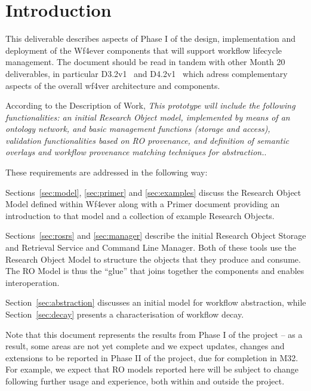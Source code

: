\section{Introduction}

This deliverable describes aspects of Phase I of the design,
implementation and deployment of the Wf4ever components that will
support workflow lifecycle management. The document should be read in
tandem with other Month 20 deliverables, in particular
D3.2v1~\cite{D3.2v1} and D4.2v1~\cite{D4.2v1} which adress
complementary aspects of the overall wf4ver architecture and
components.

According to the Description of Work, \emph{This prototype will
  include the following functionalities: an initial Research Object
  model, implemented by means of an ontology network, and basic
  management functions (storage and access), validation
  functionalities based on RO provenance, and definition of semantic
  overlays and workflow provenance matching techniques for
  abstraction.}. 

These requirements are addressed in the following way:

Sections~\ref{sec:model}, \ref{sec:primer} and \ref{sec:examples}
discuss the Research Object Model defined within Wf4ever along with a
Primer document providing an introduction to that model and a
collection of example Research Objects. 

Sections~\ref{sec:rosrs} and \ref{sec:manager} describe the initial
Research Object Storage and Retrieval Service and Command Line
Manager. Both of these tools use the Research Object Model to
structure the objects that they produce and consume. The RO Model is
thus the ``glue'' that joins together the components and enables
interoperation. 

Section~\ref{sec:abstraction} discusses an initial model for workflow
abstraction, while Section~\ref{sec:decay} presents a characterisation
of workflow decay. 

Note that this document represents the results from Phase I of the
project -- as a result, some areas are not yet complete and we expect
updates, changes and extensions to be reported in Phase II of the
project, due for completion in M32. For example, we expect that RO models reported
here will be subject to change following further usage and experience,
both within and outside the project.